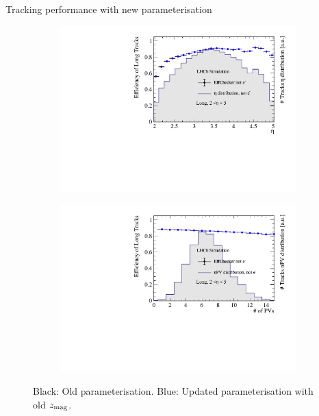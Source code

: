 \documentclass[xcolor={dvipsnames}]{beamer}
\begin{document}
\begin{frame}{Tracking performance with new parameterisation}
\begin{figure}[htb]
\begin{subfigure}{0.45\textwidth}
      \includegraphics[width=1\textwidth]{Plots/TrackEfficiency_eta_improved_MC_parameterisation.pdf}
    \end{subfigure}%
    \begin{subfigure}{0.45\textwidth}
      \includegraphics[width=1\textwidth]{Plots/TrackEfficiency_nPV_improved_MC_parameterisation.pdf}
    \end{subfigure}
    \vspace{-0.2cm}
    \caption*{Black: Old parameterisation. {\color{blue}Blue: Updated parameterisation with old $z_{\rm mag}$}.}
  \end{figure}
\end{frame}
\end{document}
